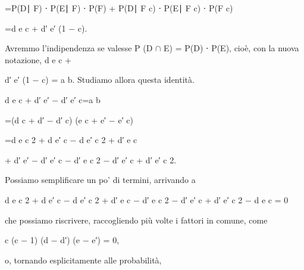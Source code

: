 \documentclass[a4paper,portrait,12pt]{article}
\begin{document}
\begin{flushleft}
=P(D∣ F) ⋅ P(E∣ F) ⋅ P(F) + P(D∣ F c) ⋅ P(E∣ F c) ⋅ P(F c)
\end{flushleft}


\begin{flushleft}
=d e c + d′ e′ (1 $-$ c).
\end{flushleft}


\begin{flushleft}
Avremmo l'indipendenza se valesse P (D $\cap$ E) = P(D) ⋅ P(E), cio\`{e}, con la nuova notazione, d e c +
\end{flushleft}


\begin{flushleft}
d′ e′ (1 $-$ c) = a b. Studiamo allora questa identit\`{a}.
\end{flushleft}


\begin{flushleft}
d e c + d′ e′ $-$ d′ e′ c=a b
\end{flushleft}


\begin{flushleft}
=(d c + d′ $-$ d′ c) (e c + e′ $-$ e′ c)
\end{flushleft}


\begin{flushleft}
=d e c 2 + d e′ c $-$ d e′ c 2 + d′ e c
\end{flushleft}


\begin{flushleft}
+ d′ e′ $-$ d′ e′ c $-$ d′ e c 2 $-$ d′ e′ c + d′ e′ c 2.
\end{flushleft}


\begin{flushleft}
Possiamo semplificare un po' di termini, arrivando a
\end{flushleft}


\begin{flushleft}
d e c 2 + d e′ c $-$ d e′ c 2 + d′ e c $-$ d′ e c 2 $-$ d′ e′ c + d′ e′ c 2 $-$ d e c = 0
\end{flushleft}


\begin{flushleft}
che possiamo riscrivere, raccogliendo più volte i fattori in comune, come
\end{flushleft}


\begin{flushleft}
c (c $-$ 1) (d $-$ d′) (e $-$ e′) = 0,
\end{flushleft}


\begin{flushleft}
o, tornando esplicitamente alle probabilit\`{a},
\end{flushleft}
\end{document}
